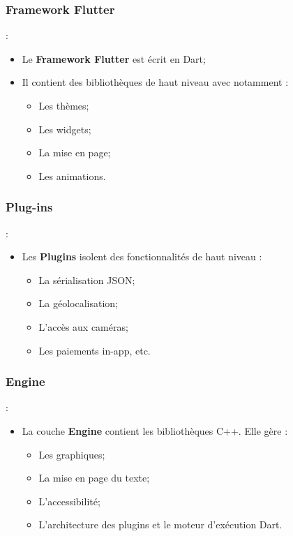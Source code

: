 \documentclass[10pt]{beamer}
\begin{document}
\subsubsection{Framework Flutter}
\begin{frame}[fragile,t]{\secname : \subsecname}
    \begin{itemize}
        \item Le \textbf{Framework Flutter} est écrit en Dart;
        \item Il contient des bibliothèques de haut niveau avec notamment :
              \begin{itemize}
                  \item Les thèmes;
                  \item Les widgets;
                  \item La mise en page;
                  \item Les animations.
              \end{itemize}
    \end{itemize}
\end{frame}
\subsubsection{Plug-ins}
\begin{frame}[fragile,t]{\secname : \subsecname}
    \begin{itemize}
        \item Les \textbf{Plugins} isolent des fonctionnalités de haut niveau :
              \begin{itemize}
                  \item La sérialisation JSON;
                  \item La géolocalisation;
                  \item L'accès aux caméras;
                  \item Les paiements in-app, etc.
              \end{itemize}
    \end{itemize}
\end{frame}

\subsubsection{Engine}
\begin{frame}[fragile,t]{\secname : \subsecname}
    \begin{itemize}
        \item La couche \textbf{Engine} contient les bibliothèques C++. Elle gère :
              \begin{itemize}
                  \item Les graphiques;
                  \item La mise en page du texte;
                  \item L'accessibilité;
                  \item L'architecture des plugins et le moteur d'exécution Dart.
              \end{itemize}
    \end{itemize}
\end{frame}
\end{document}
